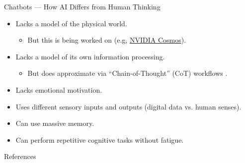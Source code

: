 \documentclass[aspectratio=169]{beamer}
\begin{document}
\begin{frame}{Chatbots — How AI Differs from Human Thinking \parencite{bennett2023brief}}
\begin{itemize}
    \item Lacks a model of the physical world.
    \begin{itemize}
        \item But this is being worked on (e.g, \href{https://www.nvidia.com/en-us/ai/cosmos/}{NVIDIA Cosmos}).
    \end{itemize}
    \item Lacks a model of its own information processing.
    \begin{itemize}
        \item But does approximate via ``Chain-of-Thought'' (CoT) workflows \parencite{wei2022chain}.
    \end{itemize}
    \item Lacks emotional motivation.
    \item Uses different sensory inputs and outputs (digital data vs. human senses).
    \item Can use massive memory.
    \item Can perform repetitive cognitive tasks without fatigue.
\end{itemize}
\end{frame}

\begin{frame}[t, allowframebreaks]{References}
  \printbibliography[heading=none]
\end{frame}
\end{document}
